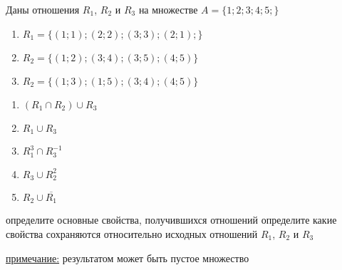 \question
Даны отношения $R_1$, $R_2$ и $R_3$ на множестве $A = \{1; 2; 3; 4; 5;\}$ 
\begin{enumerate}
	\renewcommand{\labelenumi}{\alph{enumi})}
	\item $R_1 = \{(1; 1); (2; 2); (3; 3); (2; 1);\}$
	\item $R_2 = \{(1; 2); (3; 4); (3; 5); (4; 5)\}$
	\item $R_2 = \{(1; 3); (1; 5); (3; 4); (4; 5)\}$
\end{enumerate}

\begin{enumerate}
	\renewcommand{\labelenumi}{\alph{enumi})}
	\item $(R_1 \cap R_2) \cup R_3$
	\item $R_1 \cup R_3$
	\item $R_1^3 \cap R_3^{-1}$
	\item $R_3 \cup R_2^2$
	\item $R_2 \cup \overline{R_1}$
\end{enumerate}

определите основные свойства, получившихся отношений
определите какие свойства сохраняются относительно исходных отношений $R_1$, $R_2$ и $R_3$

\underline{примечание:} результатом может быть пустое множество